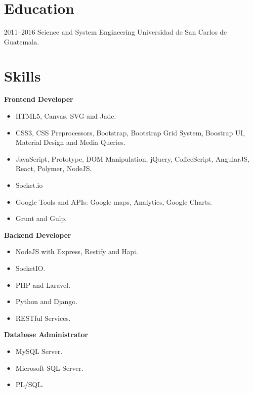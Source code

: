 \documentclass[]{friggeri-cv} %
\begin{document}
\section{Education}

\begin{entrylist}
\entry
{2011--2016}
{Science and System Engineering}
{Universidad de San Carlos de Guatemala.}
{}
\end{entrylist}


\section{Skills}

\textbf{Frontend Developer}

\begin{itemize}
	\item HTML5, Canvas, SVG and Jade.
	\item CSS3, CSS Preprocessors, Bootstrap, Bootstrap Grid System, Boostrap UI, Material Design and Media Queries.
	\item JavaScript, Prototype, DOM Manipulation, jQuery, CoffeeScript, AngularJS, React, Polymer, NodeJS.
	\item Socket.io
	\item Google Tools and APIs: Google maps, Analytics, Google Charts.
	\item Grunt and Gulp.
\end{itemize}

\textbf{Backend Developer}
\begin{itemize}
	\item NodeJS with Express, Restify and Hapi.
	\item SocketIO.
	\item PHP and Laravel.
	\item Python and Django.
	\item RESTful Services.
\end{itemize}

\textbf{Database Administrator}
\begin{itemize}
	\item MySQL Server.
	\item Microsoft SQL Server.
	\item PL/SQL.
\end{itemize}
\end{document}
